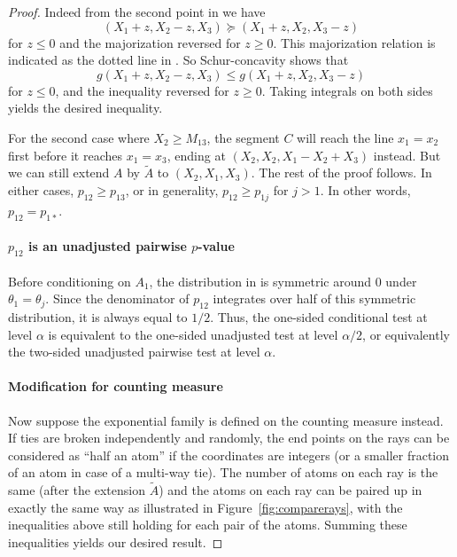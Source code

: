 \documentclass[11pt]{article}
\theoremstyle{definition}
\theoremstyle{custom}
\begin{document}
\begin{proof}
Indeed from the second point in  we have
$$\left(X_1 + z, X_2 - z, X_3\right) \succeq \left(X_1 + z, X_2, X_3 - z\right)$$
for $z \le 0$ and the majorization reversed for $z \ge 0$. This majorization relation is indicated as the dotted line in . So Schur-concavity shows that
$$g\left(X_1 + z, X_2 - z, X_3\right) \le g\left(X_1 + z, X_2, X_3 - z\right)$$
for $z \le 0$, and the inequality reversed for $z \ge 0$. Taking integrals on both sides yields the desired inequality.

For the second case where $X_2 \ge M_{13}$, the segment $C$ will reach the line $x_1 = x_2$ first before it reaches $x_1 = x_3$, ending at $\left(X_2, X_2, X_1 - X_2 + X_3\right)$ instead. But we can still extend $A$ by $\tilde{A}$ to $\left(X_2, X_1, X_3\right)$. The rest of the proof follows. In either cases, $p_{12} \ge p_{13}$, or in generality, $p_{12} \ge p_{1j}$ for $j > 1$. In other words, $p_{12} = p_{1*}$.

\paragraph{$p_{12}$ is an unadjusted pairwise $p$-value}

Before conditioning on $A_1$, the distribution in \label{eq:condlaw} is symmetric around 0 under $\theta_1=\theta_j$. Since the denominator of $p_{12}$ integrates over half of this symmetric distribution, it is always equal to $1/2$. Thus, the one-sided conditional test at level $\alpha$ is equivalent to the one-sided unadjusted test at level $\alpha/2$, or equivalently the two-sided unadjusted pairwise test at level $\alpha$.

\paragraph{Modification for counting measure}

Now suppose the exponential family is defined on the counting measure instead. If ties are broken independently and randomly, the end points on the rays can be considered as ``half an atom'' if the coordinates are integers (or a smaller fraction of an atom in case of a multi-way tie). The number of atoms on each ray is the same (after the extension $\tilde{A}$) and the atoms on each ray can be paired up in exactly the same way as illustrated in Figure~\ref{fig:comparerays}, with the inequalities above still holding for each pair of the atoms. Summing these inequalities yields our desired result.
\end{proof}
\end{document}
